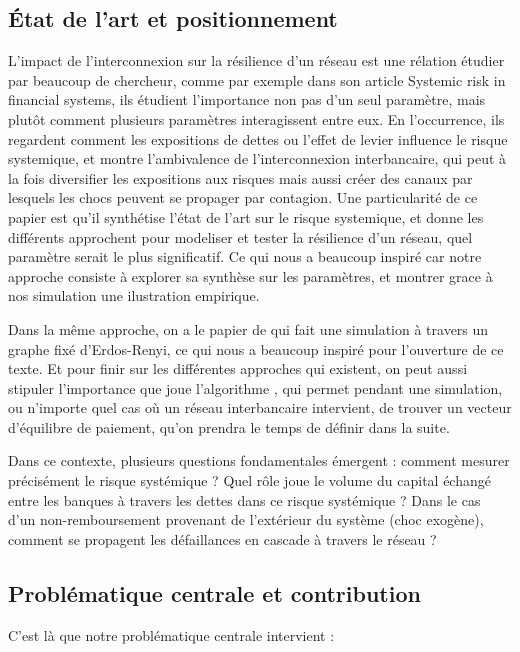 \subsection{État de l'art et positionnement}
L'impact de l'interconnexion sur la résilience d'un réseau est une rélation étudier par beaucoup de chercheur,
comme par exemple \cite{peyton2016contagion} dans son article Systemic risk in
financial systems, ils étudient l'importance non pas d'un seul paramètre,
mais plutôt comment plusieurs paramètres interagissent entre eux. En l'occurrence,
ils regardent comment les expositions de dettes ou l'effet de levier influence le risque systemique,
et montre l'ambivalence de l'interconnexion interbancaire,
qui peut à la fois diversifier les expositions aux risques mais aussi créer des canaux
par lesquels les chocs peuvent se propager par contagion. Une particularité de ce papier est qu'il synthétise l'état de l'art sur le risque systemique, et donne les différents approchent pour
modeliser et tester la résilience d'un réseau, quel paramètre serait le plus significatif. Ce qui nous a beaucoup inspiré
car notre approche consiste à explorer sa synthèse sur les paramètres, et montrer grace à nos simulation une ilustration empirique.

Dans la même approche, on a le papier de \cite{nier2008stability} qui fait une simulation
à travers un graphe fixé d'Erdos-Renyi, ce qui nous a beaucoup inspiré pour l'ouverture de ce texte.
Et pour finir sur les différentes approches qui existent, on peut aussi stipuler l'importance
que joue l'algorithme \cite{eisenberg2001systemic}, qui permet pendant une simulation,
ou n'importe quel cas où un réseau interbancaire intervient, de trouver un vecteur d'équilibre de paiement,
qu'on prendra le temps de définir dans la suite.


Dans ce contexte, plusieurs questions fondamentales émergent :
comment mesurer précisément le risque systémique ?
Quel rôle joue le volume du capital échangé entre les banques à travers les dettes dans ce risque systémique ?
Dans le cas d'un non-remboursement provenant de l'extérieur du système (choc exogène),
comment se propagent les défaillances en cascade à travers le réseau ?


\subsection{Problématique centrale et contribution}
C'est là que notre problématique centrale intervient :

